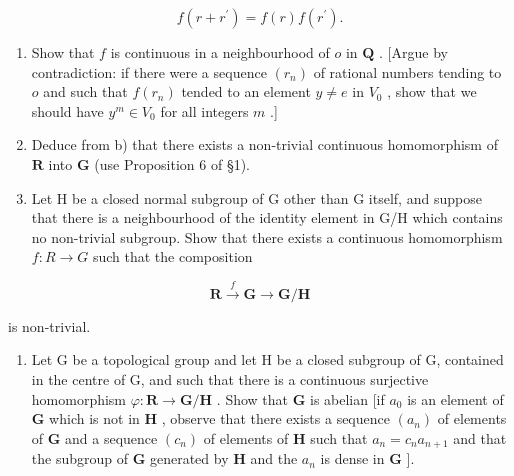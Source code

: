 \[
f (r + r ^ {\prime}) = f (r) f (r ^ {\prime}).
\]

\begin{enumerate}
\def\labelenumi{\alph{enumi})}
\setcounter{enumi}{1}
\item
  Show that \(f\) is continuous in a neighbourhood of \(o\) in \(\mathbf{Q}\) . {[}Argue by contradiction: if there were a sequence \((r_n)\) of rational numbers tending to \(o\) and such that \(f(r_n)\) tended to an element \(y \neq e\) in \(V_0\) , show that we should have \(y^m \in V_0\) for all integers \(m\) .{]}
\item
  Deduce from b) that there exists a non-trivial continuous homomorphism of \(\mathbf{R}\) into \(\mathbf{G}\) (use Proposition 6 of §1).
\item
  Let H be a closed normal subgroup of G other than G itself, and suppose that there is a neighbourhood of the identity element in G/H which contains no non-trivial subgroup. Show that there exists a continuous homomorphism \(f: R \rightarrow G\) such that the composition
\end{enumerate}

\[
\mathbf {R} \xrightarrow {f} \mathbf {G} \to \mathbf {G} / \mathbf {H}
\]

is non-trivial.

\begin{enumerate}
\def\labelenumi{\arabic{enumi})}
\setcounter{enumi}{7}
\tightlist
\item
  Let G be a topological group and let H be a closed subgroup of G, contained in the centre of G, and such that there is a continuous surjective homomorphism \(\varphi: \mathbf{R} \to \mathbf{G} / \mathbf{H}\) . Show that \(\mathbf{G}\) is abelian {[}if \(a_0\) is an element of \(\mathbf{G}\) which is not in \(\mathbf{H}\) , observe that there exists a sequence \((a_n)\) of elements of \(\mathbf{G}\) and a sequence \((c_n)\) of elements of \(\mathbf{H}\) such that \(a_n = c_n a_{n+1}\) and that the subgroup of \(\mathbf{G}\) generated by \(\mathbf{H}\) and the \(a_n\) is dense in \(\mathbf{G}\) {]}.
\end{enumerate}

